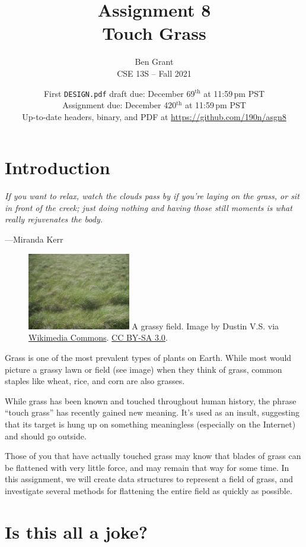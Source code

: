 \documentclass[11pt]{article}
\title{
    Assignment 8 \\
    Touch Grass
}
\author{
    Ben Grant \\
    CSE 13S -- Fall 2021
}
\date{
    First \texttt{DESIGN.pdf} draft due: December 69$^\text{th}$ at 11:59\,pm PST \\
    Assignment due: December 420$^\text{th}$ at 11:59\,pm PST \\
    Up-to-date headers, binary, and PDF at \url{https://github.com/190n/asgn8}
}
\begin{document}
\maketitle
\section{Introduction}

\setlength{\epigraphwidth}{0.76\textwidth}
\epigraph{\emph{If you want to relax, watch the clouds pass by if you're laying on the grass, or sit in front of the creek; just doing nothing and having those still moments is what really rejuvenates the body.}}{---Miranda Kerr}

\begin{figure}
\includegraphics[width=0.4\textwidth]{field}
A grassy field. Image by Dustin V.S. via \href{https://commons.wikimedia.org/wiki/File:Grasses_in_the_Valles_Caldera_2014-06-26.JPG}{Wikimedia Commons}. \href{https://creativecommons.org/licenses/by-sa/3.0/deed.en}{CC BY-SA 3.0}.
\end{figure}

\noindent
Grass is one of the most prevalent types of plants on Earth. While most would picture a grassy lawn or field (see image) when they think of grass, common staples like wheat, rice, and corn are also grasses.

While grass has been known and touched throughout human history, the phrase ``touch grass'' has recently gained new meaning. It's used as an insult, suggesting that its target is hung up on something meaningless (especially on the Internet) and should go outside.

Those of you that have actually touched grass may know that blades of grass can be flattened with very little force, and may remain that way for some time. In this assignment, we will create data structures to represent a field of grass, and investigate several methods for flattening the entire field as quickly as possible.

\section{Is this all a joke?}
\end{document}
